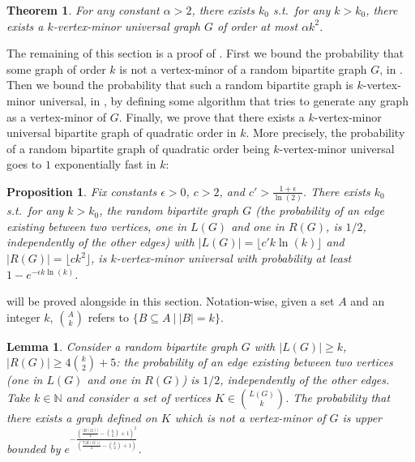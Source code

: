 \documentclass[10pt,a4paper]{article}
\newtheorem{theorem}{Theorem}[section]
\newtheorem{lemma}{Lemma}[section]
\newtheorem{proposition}{Proposition}[section]
\newcommand{\se}{\subseteq}
\newcommand{\gs}{\geqslant}
\begin{document}
\begin{theorem}
    For any constant $\alpha>2$, there exists $k_0$ s.t.~for any $k>k_0$, there exists a $k$-vertex-minor universal graph $G$ of order at most $\alpha k^2$.
    \label{thm:existence_vmu}
\end{theorem}


The remaining of this section is a proof of . First we bound the probability that some graph of order $k$ is not a vertex-minor of a random bipartite graph $G$, in . Then we bound the probability that such a random bipartite graph is $k$-vertex-minor universal, in , by defining some algorithm that tries to generate any graph as a vertex-minor of $G$. Finally, we prove that there exists a $k$-vertex-minor universal bipartite graph of quadratic order in $k$. More precisely, the probability of a random bipartite graph of quadratic order being $k$-vertex-minor universal goes to $1$ exponentially fast in $k$:

\begin{proposition}
    Fix constants $\epsilon > 0$, $c>2$, and $c'>  \frac{1+\epsilon}{\ln(2)}$. There exists $k_0$ s.t.~for any $k>k_0$, the random bipartite graph $G$ (the probability of an edge existing between two vertices, one in $L(G)$ and one in $R(G)$, is $1/2$, independently of the other edges) with $|L(G)|= \lfloor c'k\ln(k) \rfloor$ and $|R(G)| = \lfloor c k^2 \rfloor$, is $k$-vertex-minor universal with probability at least $1 - e^{-\epsilon k \ln(k)}$. 
    \label{prop:proba_exp_vmu}
\end{proposition}

 will be proved alongside  in this section. Notation-wise, given a set $A$ and an integer $k$, ${A \choose k}$ refers to $\{B \se A ~|~|B|=k\}$.

\begin{lemma}
    \label{lemma:proba_full_rank}
    Consider a random bipartite graph $G$ with $|L(G)|\gs k$, $|R(G)| \gs 4{k \choose 2}+5$: the probability of an edge existing between two vertices (one in $L(G)$ and one in $R(G)$) is $1/2$, independently of the other edges. Take $k \in \mathbb{N}$ and consider a set of vertices $K \in {L(G) \choose k}$. The probability that there exists a graph defined on $K$ which is not a vertex-minor of $G$ is upper bounded by $e^{-\frac{\left(\frac{|R(G)|}{4}-{k \choose 2}+1\right)^2}{\left(\frac{7|R(G)|}{4}-{k \choose 2}+1\right)}}$.
\end{lemma}
\end{document}
